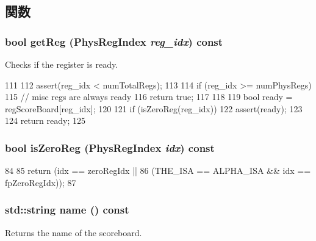 \subsection{関数}
\hypertarget{classScoreboard_acf9440aa48311ccc1f0cf3ad9add8437}{
\subsubsection[{getReg}]{\setlength{\rightskip}{0pt plus 5cm}bool getReg ({\bf PhysRegIndex} {\em reg\_\-idx}) const}}
\label{classScoreboard_acf9440aa48311ccc1f0cf3ad9add8437}
Checks if the register is ready. 


\begin{DoxyCode}
111     {
112         assert(reg_idx < numTotalRegs);
113 
114         if (reg_idx >= numPhysRegs) {
115             // misc regs are always ready
116             return true;
117         }
118 
119         bool ready = regScoreBoard[reg_idx];
120 
121         if (isZeroReg(reg_idx))
122             assert(ready);
123 
124         return ready;
125     }
\end{DoxyCode}
\hypertarget{classScoreboard_ace4f4e3c8b8625f569c7e64a169ce2f1}{
\subsubsection[{isZeroReg}]{\setlength{\rightskip}{0pt plus 5cm}bool isZeroReg ({\bf PhysRegIndex} {\em idx}) const}}
\label{classScoreboard_ace4f4e3c8b8625f569c7e64a169ce2f1}



\begin{DoxyCode}
84     {
85         return (idx == zeroRegIdx ||
86                 (THE_ISA == ALPHA_ISA && idx == fpZeroRegIdx));
87     }
\end{DoxyCode}
\hypertarget{classScoreboard_a37627d5d5bba7f4a8690c71c2ab3cb07}{
\subsubsection[{name}]{\setlength{\rightskip}{0pt plus 5cm}std::string name () const}}
\label{classScoreboard_a37627d5d5bba7f4a8690c71c2ab3cb07}
Returns the name of the scoreboard. 


